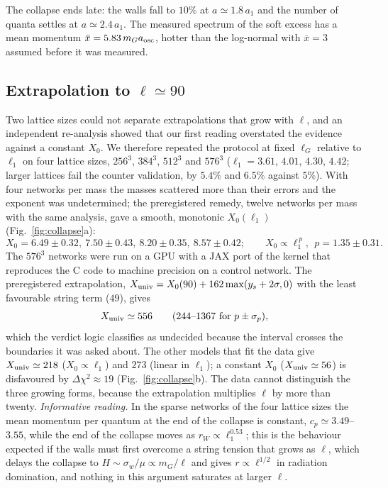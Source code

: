 \documentclass[11pt,a4paper]{article}
\newcommand{\Xu}{X_{\rm univ}}
\begin{document}
The collapse ends late: the walls fall to $10\%$ at $a\simeq1.8\,a_1$ and the number of quanta settles at $a\simeq2.4\,a_1$.
The measured spectrum of the soft excess has a mean momentum $\bar x=5.83\,m_Ga_{\rm osc}$, hotter than the log-normal with $\bar x=3$ assumed before it was measured.

\subsection{Extrapolation to $\ell\simeq90$}

Two lattice sizes could not separate extrapolations that grow with $\ell$, and an independent re-analysis showed that our first reading overstated the evidence against a constant $X_0$.
We therefore repeated the protocol at fixed $\ell_G$ relative to $\ell_1$ on four lattice sizes, $256^3$, $384^3$, $512^3$ and $576^3$ ($\ell_1=3.61$, $4.01$, $4.30$, $4.42$; larger lattices fail the counter validation, by $5.4\%$ and $6.5\%$ against $5\%$).
With four networks per mass the masses scattered more than their errors and the exponent was undetermined; the preregistered remedy, twelve networks per mass with the same analysis, gave a smooth, monotonic $X_0(\ell_1)$ (Fig.~\ref{fig:collapse}a):
\begin{equation}
X_0 = 6.49\pm0.32,\ 7.50\pm0.43,\ 8.20\pm0.35,\ 8.57\pm0.42;\qquad X_0\propto\ell_1^{\,p},\ \ p=1.35\pm0.31 .
\end{equation}
The $576^3$ networks were run on a GPU with a JAX port of the kernel that reproduces the C code to machine precision on a control network.
The preregistered extrapolation, $\Xu=X_0(90)+162\max(y_s+2\sigma,0)$ with the least favourable string term ($49$), gives
\begin{equation}
\Xu \simeq 556\qquad (244\text{--}1367\ \text{for}\ p\pm\sigma_p),
\end{equation}
which the verdict logic classifies as undecided because the interval crosses the boundaries it was asked about.
The other models that fit the data give $\Xu\simeq218$ ($X_0\propto\ell_1$) and $273$ (linear in $\ell_1$); a constant $X_0$ ($\Xu\simeq56$) is disfavoured by $\Delta\chi^2\approx19$ (Fig.~\ref{fig:collapse}b).
The data cannot distinguish the three growing forms, because the extrapolation multiplies $\ell$ by more than twenty.
\emph{Informative reading.} In the sparse networks of the four lattice sizes the mean momentum per quantum at the end of the collapse is constant, $c_p\simeq3.49$--$3.55$, while the end of the collapse moves as $r_W\propto\ell_1^{0.53}$; this is the behaviour expected if the walls must first overcome a string tension that grows as $\ell$, which delays the collapse to $H\sim\sigma_w/\mu\propto m_G/\ell$ and gives $r\propto\ell^{1/2}$ in radiation domination, and nothing in this argument saturates at larger $\ell$.
\end{document}
